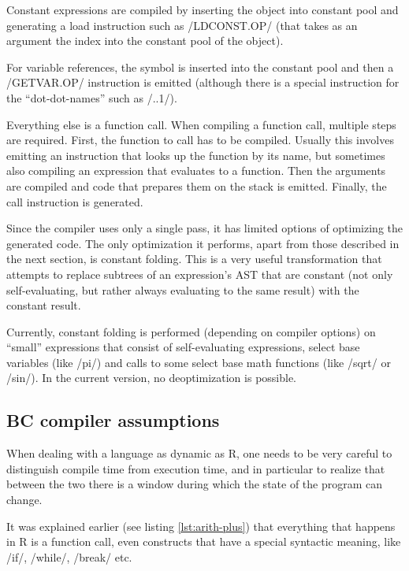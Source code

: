 {Constant expressions are compiled by inserting the object into constant pool and generating a load instruction such as \rinline/LDCONST.OP/ (that takes as an argument the index into the constant pool of the object).

For variable references, the symbol is inserted into the constant pool and then a \rinline/GETVAR.OP/ instruction is emitted (although there is a special instruction for the ``dot-dot-names'' such as \rinline/..1/).

Everything else is a function call. When compiling a function call, multiple steps are required. First, the function to call has to be compiled. Usually this involves emitting an instruction that looks up the function by its name, but sometimes also compiling an expression that evaluates to a function. Then the arguments are compiled and code that prepares them on the stack is emitted. Finally, the call instruction is generated.

Since the compiler uses only a single pass, it has limited options of optimizing the generated code. The only optimization it performs, apart from those described in the next section, is constant folding. This is a very useful transformation that attempts to replace subtrees of an expression's AST that are constant (not only self-evaluating, but rather always evaluating to the same result) with the constant result.

Currently, constant folding is performed (depending on compiler options) on ``small'' expressions that consist of self-evaluating expressions, select base variables (like \rinline/pi/) and calls to some select base math functions (like \rinline/sqrt/ or \rinline/sin/). In the current version, no deoptimization is possible.

\subsection{BC compiler assumptions\label{assumptions}}

When dealing with a language as dynamic as R, one needs to be very careful to distinguish compile time from execution time, and in particular to realize that between the two there is a window during which the state of the program can change.

It was explained earlier (see listing \ref{lst:arith-plus}) that everything that happens in R is a function call, even constructs that have a special syntactic meaning, like \rinline/if/, \rinline/while/, \rinline/break/ etc.

}
